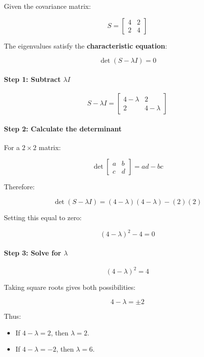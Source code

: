 \documentclass[11pt]{article}
\providecommand{\tightlist}{%
      \setlength{\itemsep}{0pt}\setlength{\parskip}{0pt}}
\begin{document}
Given the covariance matrix:

\[
S =
\begin{bmatrix}
4 & 2 \\
2 & 4
\end{bmatrix}
\]

The eigenvalues satisfy the \textbf{characteristic equation}:

\[
\det(S-\lambda I)=0
\]

\paragraph{\texorpdfstring{Step 1: Subtract
\(\lambda I\)}{Step 1: Subtract \textbackslash lambda I}}\label{step-1-subtract-lambda-i}

\[
S-\lambda I =
\begin{bmatrix}
4-\lambda & 2 \\
2 & 4-\lambda
\end{bmatrix}
\]

\paragraph{Step 2: Calculate the
determinant}\label{step-2-calculate-the-determinant}

For a \(2\times2\) matrix:

\[
\det
\begin{bmatrix}
a & b \\
c & d
\end{bmatrix}
=ad-bc
\]

Therefore:

\[
\det(S-\lambda I)
=
(4-\lambda)(4-\lambda)-(2)(2)
\]

Setting this equal to zero:

\[
(4-\lambda)^2-4=0
\]

\paragraph{\texorpdfstring{Step 3: Solve for
\(\lambda\)}{Step 3: Solve for \textbackslash lambda}}\label{step-3-solve-for-lambda}

\[
(4-\lambda)^2=4
\]

Taking square roots gives both possibilities:

\[
4-\lambda=\pm2
\]

Thus:

\begin{itemize}
\tightlist
\item
  If \(4-\lambda=2\), then \(\lambda=2\).
\item
  If \(4-\lambda=-2\), then \(\lambda=6\).
\end{itemize}
\end{document}
